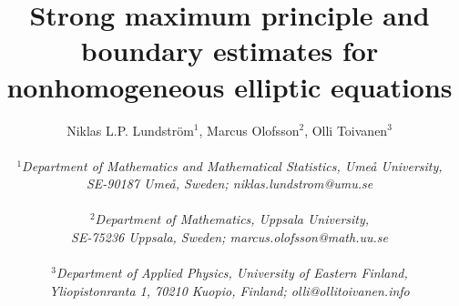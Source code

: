 \documentclass[12pt]{article}
\numberwithin{komcounter}{section}
\begin{document}
\title{Strong maximum principle and boundary estimates for nonhomogeneous elliptic equations}

\author{
Niklas L.P. Lundstr\"{o}m{\small{$^1$}},
Marcus Olofsson{\small{$^2$}},
Olli Toivanen{\small{$^3$}}
\\\\
{\small{$^1$}}\it \small Department of Mathematics and Mathematical Statistics, Ume{\aa} University,\\
\it \small SE-90187 Ume{\aa}, Sweden\/{\rm ;}
\it \small niklas.lundstrom@umu.se
\\\\
{\small{$^2$}}\it \small Department of Mathematics, Uppsala University,\\
\it \small SE-75236 Uppsala, Sweden\/{\rm ;}
\it \small marcus.olofsson@math.uu.se
\\\\
{\small{$^3$}}\it \small  Department of Applied Physics, University of Eastern Finland,\\
\it \small Yliopistonranta 1, 70210 Kuopio, Finland\/{\rm ;}
\it \small olli@ollitoivanen.info
}

\maketitle

\end{document}
